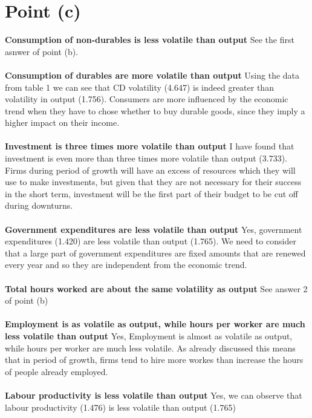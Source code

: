 \documentclass[12pt]{article}
\begin{document}
\newpage
\section{Point (c)}

\textbf{Consumption of non-durables is less volatile than output}
See the first asnwer of point (b).\\\\
\textbf{Consumption of durables are more volatile than output}
Using the data from table 1 we can see that CD volatility (4.647) is indeed greater than volatility in output (1.756). Consumers are more influenced by the economic trend when they have to chose whether to buy durable goods, since they imply a higher impact on their income. \\\\
\textbf{Investment is three times more volatile than output}
I have found that investment is even more than three times more volatile than output (3.733). Firms during period of growth will have an excess of resources which they will use to make investments, but given that they are not necessary for their success in the short term, investment will be the first part of their budget to be cut off during downturns.\\\\
\textbf{Government expenditures are less volatile than output}
Yes, government expenditures (1.420) are less volatile than output (1.765). We need to consider that a large part of government expenditures are fixed amounts that are renewed every year and so they are independent from the economic trend.\\\\
\textbf{Total hours worked are about the same volatility as output}
See answer 2 of point (b)\\\\
\textbf{Employment is as volatile as output, while hours per worker are much less volatile than output}
Yes, Employment is almost as volatile as output, while hours per worker are much less volatile. As already discussed this means that in period of growth, firms tend to hire more workes than increase the hours of people already employed. \\\\
\textbf{Labour productivity is less volatile than output}
Yes, we can observe that labour productivity (1.476) is less volatile than output (1.765)\\\\
\end{document}
